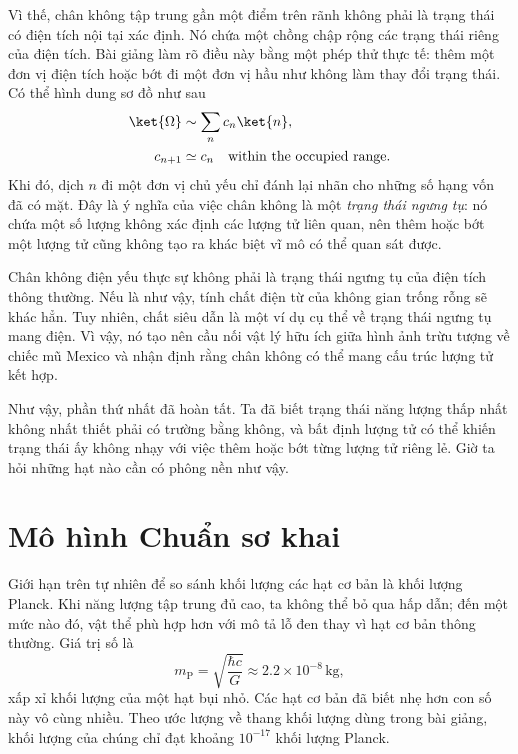 Vì thế, chân không tập trung gần một điểm trên rãnh không phải là trạng thái có điện tích nội tại xác định. Nó chứa một chồng chập rộng các trạng thái riêng của điện tích. Bài giảng làm rõ điều này bằng một phép thử thực tế: thêm một đơn vị điện tích hoặc bớt đi một đơn vị hầu như không làm thay đổi trạng thái. Có thể hình dung sơ đồ như sau
\begin{align}
\ket{\Omega}
&\sim
\sum_n c_n\ket{n},
\\
c_{n+1}
&\simeq
c_n
\quad\text{within the occupied range}.
\end{align}
Khi đó, dịch $n$ đi một đơn vị chủ yếu chỉ đánh lại nhãn cho những số hạng vốn đã có mặt. Đây là ý nghĩa của việc chân không là một \emph{trạng thái ngưng tụ}: nó chứa một số lượng không xác định các lượng tử liên quan, nên thêm hoặc bớt một lượng tử cũng không tạo ra khác biệt vĩ mô có thể quan sát được.

Chân không điện yếu thực sự không phải là trạng thái ngưng tụ của điện tích thông thường. Nếu là như vậy, tính chất điện từ của không gian trống rỗng sẽ khác hẳn. Tuy nhiên, chất siêu dẫn là một ví dụ cụ thể về trạng thái ngưng tụ mang điện. Vì vậy, nó tạo nên cầu nối vật lý hữu ích giữa hình ảnh trừu tượng về chiếc mũ Mexico và nhận định rằng chân không có thể mang cấu trúc lượng tử kết hợp.

Như vậy, phần thứ nhất đã hoàn tất. Ta đã biết trạng thái năng lượng thấp nhất không nhất thiết phải có trường bằng không, và bất định lượng tử có thể khiến trạng thái ấy không nhạy với việc thêm hoặc bớt từng lượng tử riêng lẻ. Giờ ta hỏi những hạt nào cần có phông nền như vậy.

\section{Mô hình Chuẩn sơ khai}

Giới hạn trên tự nhiên để so sánh khối lượng các hạt cơ bản là khối lượng Planck. Khi năng lượng tập trung đủ cao, ta không thể bỏ qua hấp dẫn; đến một mức nào đó, vật thể phù hợp hơn với mô tả lỗ đen thay vì hạt cơ bản thông thường. Giá trị số là
\begin{equation}
m_{\mathrm P}
=
\sqrt{\frac{\hbar c}{G}}
\approx
2.2\times10^{-8}\,\mathrm{kg},
\end{equation}
xấp xỉ khối lượng của một hạt bụi nhỏ. Các hạt cơ bản đã biết nhẹ hơn con số này vô cùng nhiều. Theo ước lượng về thang khối lượng dùng trong bài giảng, khối lượng của chúng chỉ đạt khoảng $10^{-17}$ khối lượng Planck.

